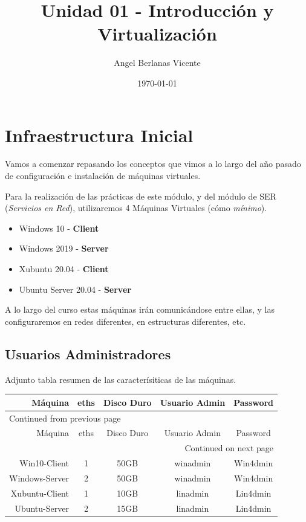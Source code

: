\documentclass[11pt]{article}
\author{Angel Berlanas Vicente}
\date{\today}
\title{Unidad 01 - Introducción y Virtualización}
\begin{document}
\maketitle
\tableofcontents

\newpage
\section{Infraestructura Inicial}
\label{sec:org4429db6}

Vamos a comenzar repasando los conceptos que vimos a lo largo del año pasado de configuración
e instalación de máquinas virtuales.

Para la realización de las prácticas de este módulo, y del módulo de SER (\emph{Servicios en Red}),
utilizaremos 4 Máquinas Virtuales (cómo \emph{mínimo}).

\begin{itemize}
\item Windows 10 - \textbf{Client}
\item Windows 2019 - \textbf{Server}
\item Xubuntu 20.04 - \textbf{Client}
\item Ubuntu Server 20.04 - \textbf{Server}
\end{itemize}

A lo largo del curso estas máquinas irán comunicándose entre ellas, y las configuraremos en redes
diferentes, en estructuras diferentes, etc.

\subsection{Usuarios Administradores}
\label{sec:orgc03cd03}



Adjunto tabla resumen de las caracterísiticas de las máquinas.

\begin{longtable}{|r|c|c|c|c|}
Máquina & eths & Disco Duro & Usuario Admin & Password\\
\hline
\endfirsthead
\multicolumn{5}{l}{Continued from previous page} \\
\hline

Máquina & eths & Disco Duro & Usuario Admin & Password \\

\hline
\endhead
\hline\multicolumn{5}{r}{Continued on next page} \\
\endfoot
\endlastfoot
\hline
Win10-Client & 1 & 50GB & winadmin & Win4dmin\\
Windows-Server & 2 & 50GB & winadmin & Win4dmin\\
Xubuntu-Client & 1 & 10GB & linadmin & Lin4dmin\\
Ubuntu-Server & 2 & 15GB & linadmin & Lin4dmin\\
\end{longtable}
\end{document}
